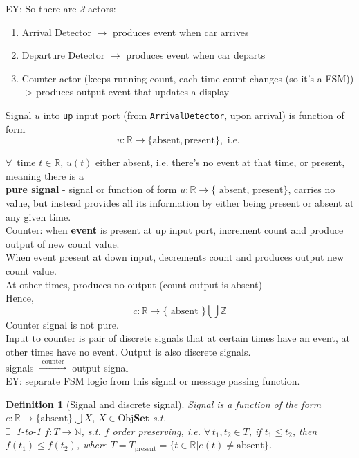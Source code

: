 \documentclass[10pt]{amsart}
\newtheorem{definition}{Definition}
\begin{document}
\begin{multicols*}{2}
EY: So there are \emph{3} actors:

\begin{enumerate}
	\item Arrival Detector $\to$ produces event when car arrives
	\item Departure Detector $\to$ produces event when car departs
	\item Counter actor (keeps running count, each time count changes (so it's a FSM)) -> produces output event that updates a display
\end{enumerate}

Signal $u$ into \texttt{up} input port (from \texttt{ArrivalDetector}, upon arrival) is function of form
\[
u : \mathbb{R} \to \lbrace \text{absent}, \text{present} \rbrace, \text{ i.e. }
\]

$\forall \, $ time $t\in \mathbb{R}$, $u(t) $ either absent, i.e. there's no event at that time, or present, meaning there is a \\

\textbf{pure signal} - signal or function of form $u:\mathbb{R} \to \lbrace \text{ absent, present} \rbrace$, carries no value, but instead provides all its information by either being present or absent at any given time. \\

Counter: when \textbf{event} is present at up input port, increment count and produce output of new count value. \\
When event present at down input, decrements count and produces output new count value. \\
At other times, produces no output (count output is absent) \\

Hence, 
\[
c: \mathbb{R} \to \lbrace \text{ absent } \rbrace \bigcup \mathbb{Z}
\]
Counter signal is not pure. \\

Input to counter is pair of discrete signals that at certain times have an event, at other times have no event. Output is also discrete signals. \\

signals $\xrightarrow{ \text{ counter } }$ output signal \\

EY: separate FSM logic from this signal or message passing function.


\begin{definition}[Signal and discrete signal]
	Signal is a function of the form $e : \mathbb{R} \to \lbrace \text{absent}  \rbrace \bigcup X, \, X \in \text{Obj}{\mathbf{Set}}$ s.t. \\
	$\exists \,$ 1-to-1 $f: T \to \mathbb{N}$, s.t. $f$ order preserving, i.e. $\forall \, t_1, t_2 \in T$, if $t_1 \leq t_2$, then $f(t_1) \leq f(t_2)$, where $T = T_{\text{present}} = \lbrace t \in \mathbb{R} | e(t) \neq \text{absent} \rbrace$.


\end{definition}
\end{multicols*}
\end{document}
